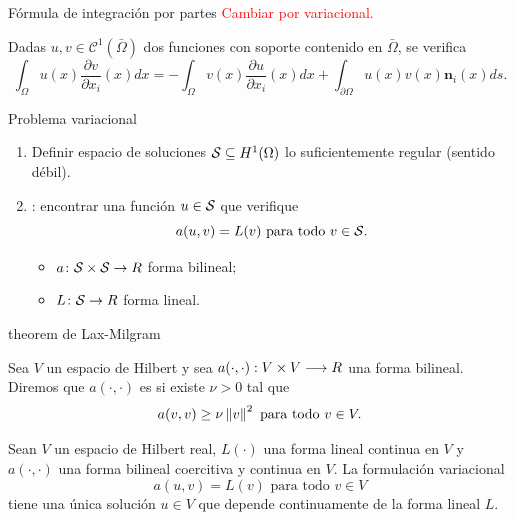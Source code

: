 \begin{frame}{Fórmula de integración por partes}
	\textcolor{red}{Cambiar por variacional.}
	\begin{theorem}
		
		Dadas $u, v\in \mathcal{C}^1(\bar\Omega)$ dos funciones con soporte contenido en $\bar\Omega$, se verifica
		\begin{equation*}
		\label{formula_int_por_partes}
		\int_\Omega u(x)\frac{\partial v}{\partial x_i}(x)dx=-\int_\Omega v(x)\frac{\partial u}{\partial x_i}(x)dx+\int_{\partial \Omega}u(x)v(x)\mathbf{n}_i(x)ds.
		\end{equation*}
		
	\end{theorem}
	
\end{frame}

\begin{frame}{Problema variacional}

\begin{enumerate}
	\item Definir espacio de soluciones $\S\subseteq H^1(\Omega)$  lo suficientemente regular (sentido débil).
	\item {}: encontrar una función $u\in \S$ que verifique $$a(u,v)=L(v)\text{ para todo }v\in \S.$$
		\begin{itemize}\itemsep1em
			\item $a\colon\S\times\S\to\R$ forma bilineal; 
			\item $L\colon\S\to\R$ forma lineal.
		\end{itemize}
\end{enumerate}

\end{frame}

\begin{frame}{theorem de Lax-Milgram}

\begin{definicion}
	Sea $V$ un espacio de Hilbert y sea $a(\cdot,\cdot):V\times V\longrightarrow\R$ una forma bilineal. Diremos que $a(\cdot,\cdot)$ es  si existe $\nu>0$ tal que $$a(v,v)\geq\nu\norma{v}^2\text{ para todo } v\in V.$$
\end{definicion}

\begin{theorem}
	\label{theorem:Lax_Milgram}
	Sean $V$ un espacio de Hilbert real, $L(\cdot)$ una forma lineal continua en $V$ y $a(\cdot,\cdot)$ una forma bilineal coercitiva y continua en $V$. La formulación variacional $$a(u,v)=L(v)\text{ para todo }v\in V$$ tiene una única solución $u\in V$ que depende continuamente de la forma lineal $L$.
\end{theorem}

\end{frame}

